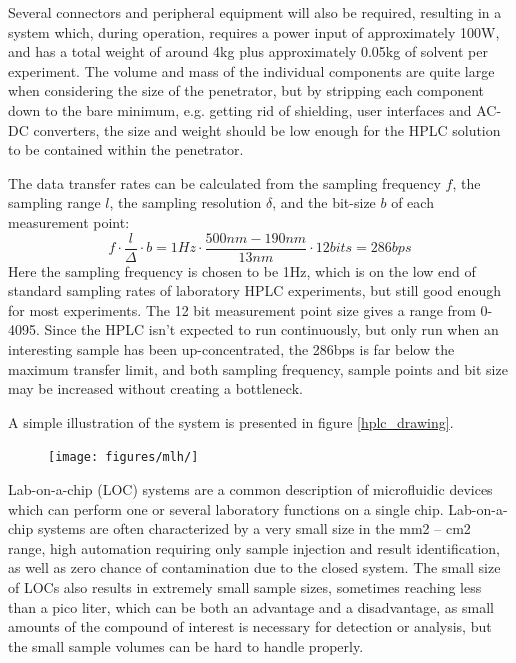 Several connectors and peripheral equipment will also be required, resulting in a system which, during operation, requires a power input of approximately 100W, and has a total weight of around 4kg plus approximately 0.05kg of solvent per experiment. The volume and mass of the individual components are quite large when considering the size of the penetrator, but by stripping each component down to the bare minimum, e.g. getting rid of shielding, user interfaces and AC-DC converters, the size and weight should be low enough for the HPLC solution to be contained within the penetrator. 

The data transfer rates can be calculated from the sampling frequency $f$, the sampling range $l$, the sampling resolution $\delta$, and the bit-size $b$ of each measurement point:
\begin{equation}
    f \cdot \frac{l}{\Delta} \cdot b = 1Hz \cdot \frac{500nm-190nm}{13nm} \cdot 12bits = 286bps
\end{equation}
Here the sampling frequency is chosen to be 1Hz, which is on the low end of standard sampling rates of laboratory HPLC experiments, but still good enough for most experiments. The 12 bit measurement point size gives a range from 0-4095. Since the HPLC isn’t expected to run continuously, but only run when an interesting sample has been up-concentrated, the 286bps is far below the maximum transfer limit, and both sampling frequency, sample points and bit size may be increased without creating a bottleneck.

A simple illustration of the system is presented in figure \ref{hplc_drawing}.
\begin{figure}[htb]
	\centering
	\texttt{[image: figures/mlh/]}
	\caption{}
	\label{fig:hplc_drawing}
\end{figure}

Lab-on-a-chip (LOC) systems are a common description of microfluidic devices which can perform one or several laboratory functions on a single chip. Lab-on-a-chip systems are often characterized by a very small size in the mm2 – cm2 range, high automation requiring only sample injection and result identification, as well as zero chance of contamination due to the closed system. The small size of LOCs also results in extremely small sample sizes, sometimes reaching less than a pico liter, which can be both an advantage and a disadvantage, as small amounts of the compound of interest is necessary for detection or analysis, but the small sample volumes can be hard to handle properly. \cite{wiki_loc} \cite{labchip}


